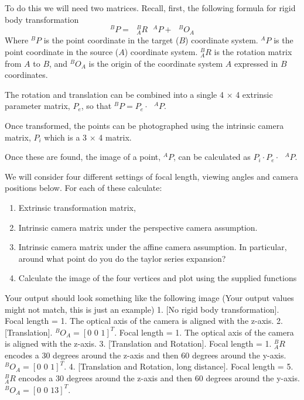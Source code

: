 \documentclass[11pt]{article}
\begin{document}
To do this we will need two matrices. Recall, first, the following
formula for rigid body transformation \[
^BP = \text{ } ^B_AR\text{ }^AP + \text{ } ^BO_A
\] Where \(^BP\) is the point coordinate in the target (\(B\))
coordinate system. \(^AP\) is the point coordinate in the source (\(A\))
coordinate system. \(^B_AR\) is the rotation matrix from \(A\) to \(B\),
and \(^BO_A\) is the origin of the coordinate system \(A\) expressed in
\(B\) coordinates.

The rotation and translation can be combined into a single 4 \(\times\)
4 extrinsic parameter matrix, \(P_e\), so that
\(^BP = P_e \cdot \text{ }^AP\).

Once transformed, the points can be photographed using the intrinsic
camera matrix, \(P_i\) which is a 3 \(\times\) 4 matrix.

Once these are found, the image of a point, \(^AP\), can be calculated
as \(P_i \cdot P_e \cdot \text{ }^AP\).

We will consider four different settings of focal length, viewing angles
and camera positions below. For each of these calculate:

\begin{enumerate}
\def\labelenumi{\alph{enumi})}
\item
  Extrinsic transformation matrix,
\item
  Intrinsic camera matrix under the perspective camera assumption.
\item
  Intrinsic camera matrix under the affine camera assumption. In
  particular, around what point do you do the taylor series expansion?
\item
  Calculate the image of the four vertices and plot using the supplied
  functions
\end{enumerate}

Your output should look something like the following image (Your output
values might not match, this is just an example) 1. {[}No rigid body
transformation{]}. Focal length = 1. The optical axis of the camera is
aligned with the z-axis. 2. {[}Translation{]}.
\(^BO_A = [\text{0 0 1}]^T\). Focal length = 1. The optical axis of the
camera is aligned with the z-axis. 3. {[}Translation and Rotation{]}.
Focal length = 1. \(^B_AR\) encodes a 30 degrees around the z-axis and
then 60 degrees around the y-axis. \(^BO_A = [\text{0 0 1}]^T\). 4.
{[}Translation and Rotation, long distance{]}. Focal length = 5.
\(^B_AR\) encodes a 30 degrees around the z-axis and then 60 degrees
around the y-axis. \(^BO_A = [\text{0 0 13}]^T\).
\end{document}
